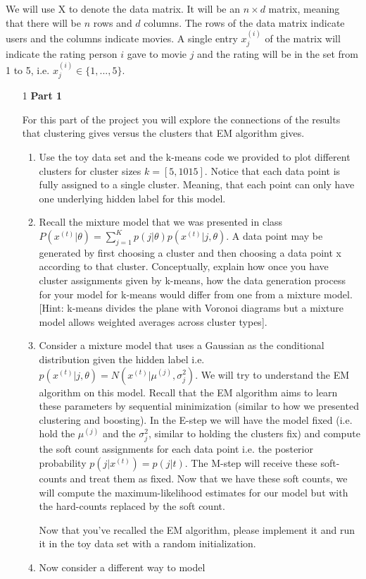We will use X to denote the data matrix. It will be an $n \times d$ matrix, meaning that there will be $n$ rows and $d$ columns. The rows of the data matrix indicate users and the columns indicate movies. A single entry $x^{(i)}_{j}$ of the matrix will indicate the rating person $i$ gave to movie $j$ and the rating will be in the set from 1 to 5, i.e. $x^{(i)}_{j} \in \{ 1, ..., 5\}$.
\begin{enumerate}

\item[1] {\bf Part 1}

For this part of the project you will explore the connections of the results that clustering gives versus the clusters that EM algorithm gives.

\begin{enumerate}
  \item Use the toy data set and the k-means code we provided to plot different clusters for cluster sizes $k = [5, 10 15]$. Notice that each data point is fully assigned to a single cluster. Meaning, that each point can only have one underlying hidden label for this model.
  \item Recall the mixture model that we was presented in class $P(x^{(t)} | \theta) = \sum^{K}_{j=1} p(j| \theta)p(x^{(t)} | j, \theta) $. A data point may be generated by first choosing a cluster and then choosing a data point x according to that cluster. Conceptually, explain how once you have cluster assignments given by k-means, how the data generation process for your model for k-means would differ from one from a mixture model. [Hint: k-means divides the plane with Voronoi diagrams but a mixture model allows weighted averages across cluster types].
  \item Consider a mixture model that uses a Gaussian as the conditional distribution given the hidden label i.e. $p(x^{(t)} | j, \theta) = N(x^{(t)}| \mu^{(j)}, \sigma^2_{j})$.  We will try to understand the EM algorithm on this model. 
 Recall that the EM algorithm aims to learn these parameters by sequential minimization (similar to how we presented clustering and boosting). 
In the E-step we will have the model fixed (i.e. hold the $ \mu^{(j)}$ and the $\sigma^2_{j}$, similar to holding the clusters fix) and compute the soft count assignments for each data point i.e. the posterior probability $p(j | x^{(t)}) = p(j|t)$. The M-step will receive these soft-counts and treat them as fixed. Now that we have these soft counts, we will compute the maximum-likelihood estimates for our model but with the hard-counts replaced by the soft count. 

Now that you've recalled the EM algorithm, please implement it and run it in the toy data set with a random initialization. 

\item Now consider a different way to model
\end{enumerate}

\end{enumerate}





